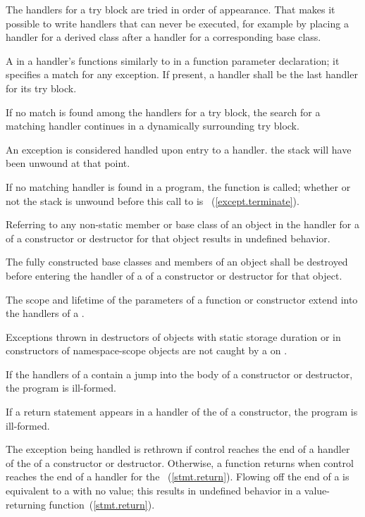 \pnum
The handlers for a try block are tried in order of appearance.
That makes it possible to write handlers that can never be
executed, for example by placing a handler for a derived class after
a handler for a corresponding base class.

\pnum
A
in a handler's
functions similarly to
in a function parameter declaration;
it specifies a match for any exception.
If present, a
handler shall be the last handler for its try block.

\pnum
If no match is found among the handlers for a try block,
the search for a matching
handler continues in a dynamically surrounding try block.

\pnum
An exception is considered handled upon entry to a handler.
\enternote
the stack will have been unwound at that point.
\exitnote

\pnum
If no matching handler is found in a program,
the function
is called;
whether or not the stack is unwound before this call to
is ~(\ref{except.terminate}).

\pnum
Referring to any non-static member or base class of an object
in the handler for a
of a constructor or destructor for that object results in undefined behavior.

\pnum
The fully constructed base classes and members of an object shall
be destroyed before entering the handler of a
of a constructor or destructor for that object.

\pnum
The scope and lifetime of the parameters of a function or constructor
extend into the handlers of a
.

\pnum
Exceptions thrown in destructors of objects with static storage duration or in
constructors of namespace-scope objects are not caught by a
on
.

\pnum
If the handlers of a
contain a jump into the body of a constructor or destructor, the program
is ill-formed.

\pnum
If a return statement appears in a handler of the
of a constructor, the program is ill-formed.

\pnum
The exception being handled
is rethrown if control reaches the end of a handler of the
of a constructor or destructor. Otherwise, a
function returns when control reaches the end of a handler for the
~(\ref{stmt.return}).
Flowing off the end of a
is equivalent to a
with no value;
this results in undefined behavior in a value-returning function~(\ref{stmt.return}).

